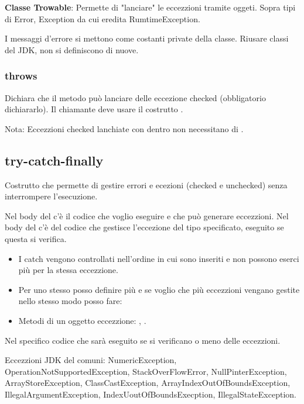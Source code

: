 \medskip

\textbf{Classe Trowable}:  Permette di "lanciare" le eccezzioni tramite oggeti. Sopra tipi di Error, Exception da cui eredita RumtimeException.

\medskip

I messaggi d'errore si mettono come costanti private della classe.
Riusare classi del JDK, non si definiscono di nuove.

\subsubsection{throws}
Dichiara che il metodo può lanciare delle eccezione checked (obbligatorio dichiararlo). Il chiamante deve usare il costrutto .


Nota: Eccezzioni checked lanchiate con  dentro  non necessitano di .

\subsection{try-catch-finally}
Costrutto che permette di gestire errori e ecezioni (checked e unchecked) senza interrompere l'esecuzione.


Nel body del  c'è il codice che voglio eseguire e che può generare eccezzioni. Nel body del  c'è del codice che gestisce l'eccezione del tipo specificato, eseguito se questa si verifica.

\begin{itemize}
	\item I catch vengono controllati nell'ordine in cui sono inseriti e non possono eserci più  per la stessa eccezzione.

	\item Per uno stesso  posso definire più  e se voglio che più eccezzioni vengano gestite nello stesso modo posso fare:


	\item Metodi di un oggetto eccezzione: , .
\end{itemize}

Nel  specifico codice che sarà eseguito se si verificano o meno delle eccezzioni.

\bigskip

Eccezzioni JDK del  comuni: NumericException, OperationNotSupportedException, StackOverFlowError, NullPinterException, ArrayStoreException, ClassCastException, ArrayIndexOutOfBoundsException, IllegalArgumentException, IndexUoutOfBoundsExecption, IllegalStateException.

